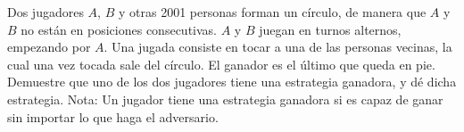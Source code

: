 Dos jugadores $ A$, $ B$ y otras 2001 personas forman un círculo, de manera que $ A$ y $ B$ no están en posiciones consecutivas. $ A$ y $ B$ juegan en turnos alternos, empezando por $ A$. Una jugada consiste en tocar a una de las personas vecinas, la cual una vez tocada sale del círculo. El ganador es el último que queda en pie.
Demuestre que uno de los dos jugadores tiene una estrategia ganadora, y dé dicha estrategia.
Nota: Un jugador tiene una estrategia ganadora si es capaz de ganar sin importar lo que haga el adversario.
